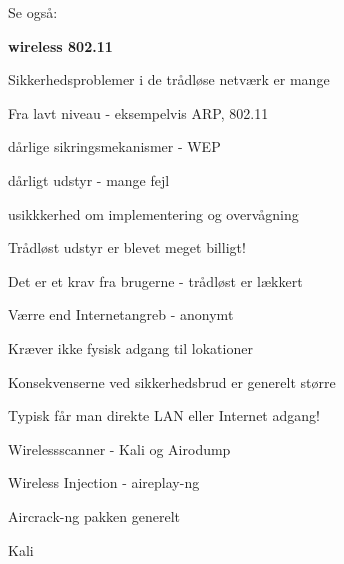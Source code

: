 \documentclass[Screen16to9,17pt]{foils}
\begin{document}

\begin{list1}
\item Se også:
\end{list1}








\centerline{\color{titlecolor}\LARGE\bf wireless 802.11}

\begin{list1}
\item Sikkerhedsproblemer i de trådløse netværk er mange
  \begin{list2}
  \item Fra lavt niveau - eksempelvis ARP, 802.11
  \item dårlige sikringsmekanismer - WEP
  \item dårligt udstyr - mange fejl
  \item usikkkerhed om implementering og overvågning
  \end{list2}
\item Trådløst udstyr er blevet meget billigt!
\item Det er et krav fra brugerne - trådløst er lækkert
\end{list1}




\begin{list2}
\item Værre end Internetangreb - anonymt
\item Kræver ikke fysisk adgang til lokationer
\item Konsekvenserne ved sikkerhedsbrud er generelt større
\item Typisk får man direkte LAN eller Internet adgang!
\end{list2}





\begin{list2}
\item Wirelessscanner - Kali og Airodump
\item Wireless Injection - aireplay-ng
\item Aircrack-ng pakken generelt
\item Kali 
\end{list2}
\end{document}
